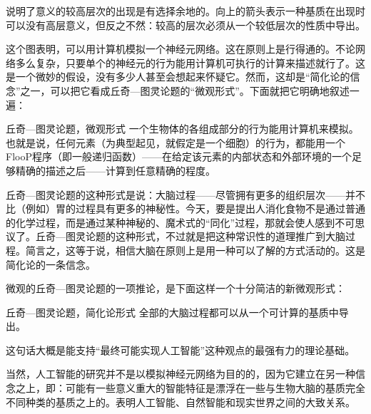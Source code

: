 说明了意义的较高层次的出现是有选择余地的。向上的箭头表示一种基质在出现时可以没有高层意义，但反之不然：较高的层次必须从一个较低层次的性质中导出。

这个图表明，可以用计算机模拟一个神经元网络。这在原则上是行得通的。不论网络多么复杂，只要单个的神经元的行为能用计算机可执行的计算来描述就行了。这是一个微妙的假设，没有多少人甚至会想起来怀疑它。然而，这却是“简化论的信念”之一，可以把它看成丘奇—图灵论题的“微观形式”。下面就把它明确地叙述一遍：

\begin{thm}[2\ccwd]{丘奇—图灵论题，微观形式}
一个生物体的各组成部分的行为能用计算机来模拟。也就是说，任何元素（为典型起见，就假定是一个细胞）的行为，都能用一个FlooP程序（即一般递归函数）——在给定该元素的内部状态和外部环境的一个足够精确的描述之后——计算到任意精确的程度。
\end{thm}

丘奇—图灵论题的这种形式是说：大脑过程——尽管拥有更多的组织层次——并不比（例如）胃的过程具有更多的神秘性。今天，要是提出人消化食物不是通过普通的化学过程，而是通过某种神秘的、魔术式的“同化”过程，那就会使人感到不可思议了。丘奇—图灵论题的这种形式，不过就是把这种常识性的道理推广到大脑过程。简言之，这等于说，相信大脑在原则上是用一种可以了解的方式活动的。这是简化论的一条信念。

微观的丘奇—图灵论题的一项推论，是下面这样一个十分简洁的新微观形式：

\begin{thm}[2\ccwd]{丘奇—图灵论题，简化论形式}
全部的大脑过程都可以从一个可计算的基质中导出。
\end{thm}

这句话大概是能支持“最终可能实现人工智能”这种观点的最强有力的理论基础。

当然，人工智能的研究并不是以模拟神经元网络为目的的，因为它建立在另一种信念之上，即：可能有一些意义重大的智能特征是漂浮在一些与生物大脑的基质完全不同种类的基质之上的。表明人工智能、自然智能和现实世界之间的大致关系。


